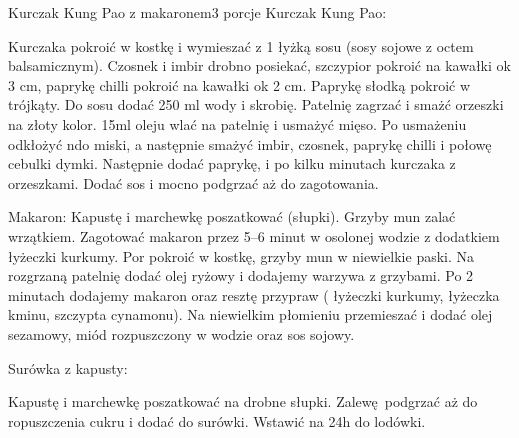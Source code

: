 \documentclass[a4paper,12pt]{article}
\begin{document}
\begin{recipe}{Kurczak Kung Pao z makaronem}{3 porcje}{}
\freeform%
Kurczak Kung Pao:

Kurczaka pokroić w kostkę i wymieszać z 1 łyżką sosu (sosy sojowe z octem balsamicznym). Czosnek i imbir drobno posiekać, szczypior pokroić na kawałki ok 3 cm, paprykę chilli pokroić na kawałki ok 2 cm. 
Paprykę słodką pokroić w trójkąty. Do sosu dodać 250 ml wody i skrobię. Patelnię zagrzać i smażć orzeszki na złoty kolor. 15ml oleju wlać na patelnię i usmażyć mięso. Po usmażeniu odkłożyć ndo miski, a następnie smażyć imbir, czosnek, paprykę chilli i połowę cebulki dymki. Następnie dodać paprykę, i po kilku minutach kurczaka z orzeszkami. Dodać sos i mocno podgrzać aż do zagotowania.

\freeform%
Makaron:
Kapustę i marchewkę poszatkować (słupki). Grzyby mun zalać wrzątkiem. Zagotować makaron przez 5--6 minut w osolonej wodzie z dodatkiem  łyżeczki kurkumy.
Por pokroić w kostkę, grzyby mun w niewielkie paski. Na rozgrzaną patelnię dodać olej ryżowy i dodajemy warzywa z grzybami.
Po 2 minutach dodajemy makaron oraz resztę przypraw ( łyżeczki kurkumy, łyżeczka kminu, szczypta cynamonu). Na niewielkim płomieniu przemieszać i dodać olej sezamowy, miód rozpuszczony w wodzie oraz sos sojowy.

\newpage

\freeform%
Surówka z kapusty:

Kapustę i marchewkę poszatkować na drobne słupki. Zalewę podgrzać aż do ropuszczenia cukru i dodać do surówki. Wstawić na 24h do lodówki.

\end{recipe}
\end{document}

